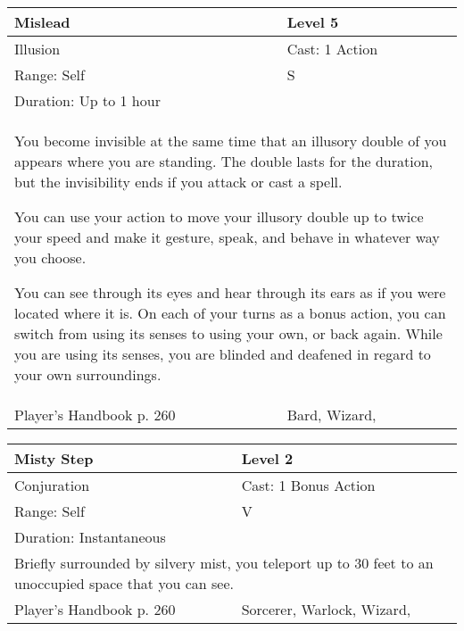 \documentclass[11pt]{report}
\begin{document}
\begin{table}[H]
	\begin{tabular}{||p{6cm}|p{6cm}||}
		\hline\hline
		\bf{Mislead} & Level 5\\ \hline
		Illusion & Cast: 1 Action\\ \hline
		Range: Self & S\\ \hline
		Duration: Up to 1 hour & \\ \hline
		\multicolumn{2}{||p{12cm}||}{You become invisible at the same time that an illusory double of you appears where you are standing. The double lasts for the duration, but the invisibility ends if you attack or cast a spell.

You can use your action to move your illusory double up to twice your speed and make it gesture, speak, and behave in whatever way you choose.

You can see through its eyes and hear through its ears as if you were located where it is. On each of your turns as a bonus action, you can switch from using its senses to using your own, or back again. While you are using its senses, you are blinded and deafened in regard to your own surroundings.}\\ \hline
Player's Handbook p. 260 & Bard, Wizard, \\ \hline\hline
	\end{tabular}
\end{table}

\begin{table}[H]
	\begin{tabular}{||p{6cm}|p{6cm}||}
		\hline\hline
		\bf{Misty Step} & Level 2\\ \hline
		Conjuration & Cast: 1 Bonus Action\\ \hline
		Range: Self & V\\ \hline
		Duration: Instantaneous & \\ \hline
		\multicolumn{2}{||p{12cm}||}{Briefly surrounded by silvery mist, you teleport up to 30 feet to an unoccupied space that you can see.}\\ \hline
Player's Handbook p. 260 & Sorcerer, Warlock, Wizard, \\ \hline\hline
	\end{tabular}
\end{table}
\end{document}
